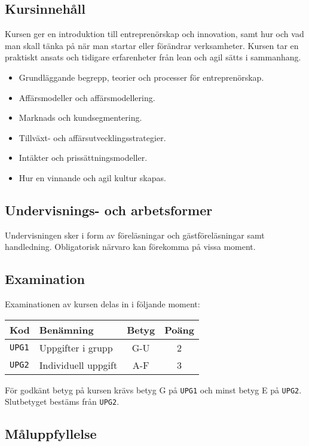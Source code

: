 \subsection*{Kursinnehåll}

Kursen ger en introduktion till entreprenörskap och innovation, samt hur
och vad man skall tänka på när man startar eller förändrar verksamheter.
Kursen tar en praktiskt ansats och tidigare erfarenheter från lean och
agil sätts i sammanhang.

\begin{itemize}
\tightlist
\item
  Grundläggande begrepp, teorier och processer för entreprenörskap.
\item
  Affärsmodeller och affärsmodellering.
\item
  Marknads och kundsegmentering.
\item
  Tillväxt- och affärsutvecklingsstrategier.
\item
  Intäkter och prissättningsmodeller.
\item
  Hur en vinnande och agil kultur skapas.
\end{itemize}

\subsection*{Undervisnings- och
arbetsformer}

Undervisningen sker i form av föreläsningar och gästföreläsningar samt
handledning. Obligatorisk närvaro kan förekomma på vissa moment.

\subsection*{Examination}

Examinationen av kursen delas in i följande moment:

\begin{longtable}[]{@{}llcc@{}}
\toprule
\textsf{Kod} & \textsf{Benämning} & \textsf{Betyg} & \textsf{Poäng}\tabularnewline
\midrule
\endhead
\texttt{UPG1} & Uppgifter i grupp & G-U & 2\tabularnewline
\texttt{UPG2} & Individuell uppgift & A-F & 3\tabularnewline
\bottomrule
\end{longtable}

För godkänt betyg på kursen krävs betyg G på \texttt{UPG1} och minst betyg E på
\texttt{UPG2}. Slutbetyget bestäms från \texttt{UPG2}.

\subsection*{Måluppfyllelse}


